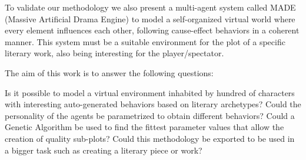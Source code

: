 \documentclass{sig-alternate}
\begin{document}










To validate our methodology we also present a multi-agent system called
MADE (Massive Artificial Drama Engine) to model a self-organized
virtual world where every element influences each other, following
cause-effect behaviors in a coherent manner. This system must be
a suitable environment for the plot of a specific literary work, also being
interesting for the player/spectator. %

The aim of this work is to answer the following questions:


 Is it possible to model a virtual environment inhabited by hundred of characters with interesting auto-generated behaviors based on literary archetypes?
 Could the personality of the agents be parametrized to obtain different behaviors?
 Could a Genetic Algorithm be used to find the fittest parameter values that allow the creation of quality sub-plots?
Could this methodology be exported to be used in a bigger task such as creating a literary piece or work?
\
\end{document}

